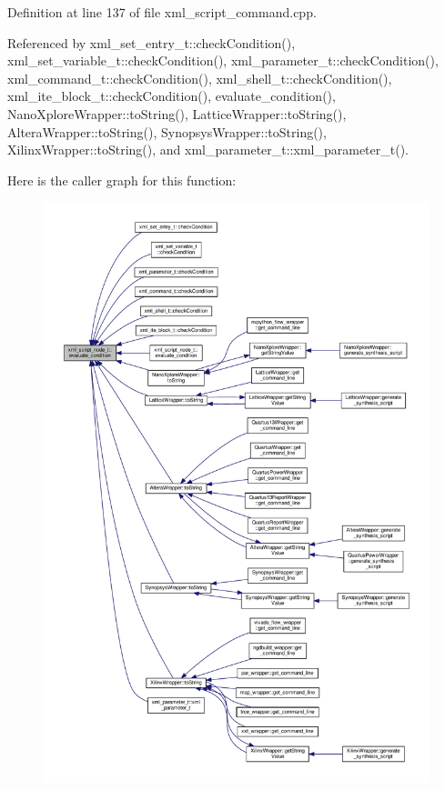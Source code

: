 Definition at line 137 of file xml\+\_\+script\+\_\+command.\+cpp.



Referenced by xml\+\_\+set\+\_\+entry\+\_\+t\+::check\+Condition(), xml\+\_\+set\+\_\+variable\+\_\+t\+::check\+Condition(), xml\+\_\+parameter\+\_\+t\+::check\+Condition(), xml\+\_\+command\+\_\+t\+::check\+Condition(), xml\+\_\+shell\+\_\+t\+::check\+Condition(), xml\+\_\+ite\+\_\+block\+\_\+t\+::check\+Condition(), evaluate\+\_\+condition(), Nano\+Xplore\+Wrapper\+::to\+String(), Lattice\+Wrapper\+::to\+String(), Altera\+Wrapper\+::to\+String(), Synopsys\+Wrapper\+::to\+String(), Xilinx\+Wrapper\+::to\+String(), and xml\+\_\+parameter\+\_\+t\+::xml\+\_\+parameter\+\_\+t().

Here is the caller graph for this function\+:
\nopagebreak
\begin{figure}[H]
\begin{center}
\leavevmode
\includegraphics[width=350pt]{d6/de5/classxml__script__node__t_a01f5c0deca615d53775e40a512be3226_icgraph}
\end{center}
\end{figure}
\mbox{\label{classxml__script__node__t_ad27af696d98812f71634159dd6f5052c}} 
